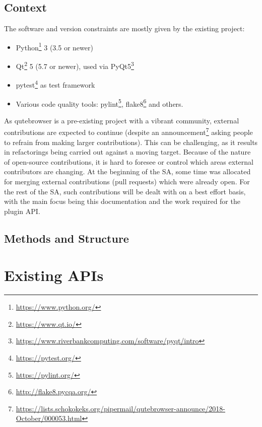 \documentclass[a4paper,parskip=full]{scrreprt}
\begin{document}
\section{Context}

The software and version constraints are mostly given by the existing project:

\begin{itemize}
  \item Python\footnote{\url{https://www.python.org/}} 3 (3.5 or newer)
  \item Qt\footnote{\url{https://www.qt.io/}} 5 (5.7 or newer), used via PyQt5\footnote{\url{https://www.riverbankcomputing.com/software/pyqt/intro}}
  \item pytest\footnote{\url{https://pytest.org/}} as test framework
  \item Various code quality tools: pylint\footnote{\url{https://pylint.org/}},
    flake8\footnote{\url{http://flake8.pycqa.org/}} and others.
\end{itemize}

As qutebrowser is a pre-existing project with a vibrant community, external
contributions are expected to continue (despite an
announcement\footnote{\url{https://lists.schokokeks.org/pipermail/qutebrowser-announce/2018-October/000053.html}}
asking people to refrain from making larger contributions). This can be challenging,
as it results in refactorings being carried out against a moving target. Because
of the nature of open-source contributions,
it is hard to foresee or control which areas external contributors are changing.
At the beginning of the SA, some time was allocated for merging external
contributions (pull requests) which were already open. For the rest of the SA,
such contributions will be dealt with on a best effort basis, with the main
focus being this documentation and the work required for the plugin API.

\section{Methods and Structure}



\chapter{Existing APIs}
\label{unsuitable}
\end{document}
